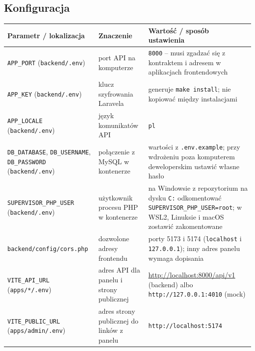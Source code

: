 \documentclass[11pt,a4paper,oneside]{article}
\newif\ifpodpowiedzi
\newcommand{\podpowiedz}[1]{\ifpodpowiedzi\par\begingroup\small\color{hintcolor}\textit{Wskazówka: #1}\par\endgroup\fi}
\begin{document}


\subsection{Konfiguracja}
\podpowiedz{Wskaż pliki konfiguracyjne, zmienne środowiskowe i ustawienia usług. Wyjaśnij znaczenie parametrów, wymagane wartości i miejsca ich zmiany. Uwzględnij porty, ścieżki, połączenia, konta i uprawnienia, jeśli występują. Używaj przykładowych wartości; nie wpisuj rzeczywistych haseł, tokenów ani kluczy. Wyjaśnij, jak osoba wdrażająca projekt ma dostarczyć własne dane dostępowe.}
\begin{tabularx}{\textwidth}{@{}Y Y Y@{}}
\toprule
Parametr / lokalizacja & Znaczenie & Wartość / sposób ustawienia\\
\midrule
\texttt{APP\_PORT} (\texttt{backend/.env}) & port API na komputerze & \texttt{8000} -- musi zgadzać się z kontraktem i adresem w aplikacjach frontendowych\\
\texttt{APP\_KEY} (\texttt{backend/.env}) & klucz szyfrowania Laravela & generuje \texttt{make install}; nie kopiować między instalacjami\\
\texttt{APP\_LOCALE} (\texttt{backend/.env}) & język komunikatów API & \texttt{pl}\\
\texttt{DB\_DATABASE}, \texttt{DB\_USERNAME}, \texttt{DB\_PASSWORD} (\texttt{backend/.env}) & połączenie z MySQL w kontenerze & wartości z \texttt{.env.example}; przy wdrożeniu poza komputerem deweloperskim ustawić własne hasło\\
\texttt{SUPERVISOR\_PHP\_USER} (\texttt{backend/.env}) & użytkownik procesu PHP w kontenerze & na Windowsie z repozytorium na dysku \texttt{C:} odkomentować \texttt{SUPERVISOR\_PHP\_USER=root}; w WSL2, Linuksie i macOS zostawić zakomentowane\\
\texttt{backend/config/cors.php} & dozwolone adresy frontendu & porty 5173 i 5174 (\texttt{localhost} i \texttt{127.0.0.1}); inny adres panelu wymaga dopisania\\
\texttt{VITE\_API\_URL} (\texttt{apps/*/.env}) & adres API dla panelu i strony publicznej & \url{http://localhost:8000/api/v1} (backend) albo \texttt{http://127.0.0.1:4010} (mock)\\
\texttt{VITE\_PUBLIC\_URL} (\texttt{apps/admin/.env}) & adres strony publicznej do linków z panelu & \texttt{http://localhost:5174}\\

\end{tabularx}
\end{document}
